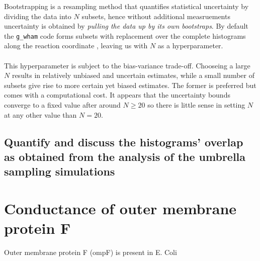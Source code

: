 \documentclass{article}[12pt]
\numberwithin{equation}{section}
\def\code#1{\texttt{#1}}
\begin{document}
Bootstrapping is a resampling method that quantifies statistical uncertainty by
dividing the data into $N$ subsets, hence without additional measruements
uncertainty is obtained by \textit{pulling the data up by its own bootstraps}.
By default the \code{g\_wham} code forms subsets with replacement over the
complete histograms along the reaction coordinate \cite{gwham2010}, leaving us
with $N$ as a hyperparameter.
\\\\
This hyperparameter is subject to the bias-variance trade-off. Chooseing a large
$N$ results in relatively unbiased and uncertain estimates, while a small number
of subsets give rise to more certain yet biased estimates. The former is
preferred but comes with a computational cost. It appears that the uncertainty
bounds converge to a fixed value after around $N\geq20$ so there is little sense
in setting $N$ at any other value than $N=20$.

\subsection{Quantify and discuss the histograms’ overlap as
obtained from the analysis of the umbrella sampling simulations}

\section{Conductance of outer membrane protein F}
Outer membrane protein F (ompF) is present in E. Coli
\end{document}
